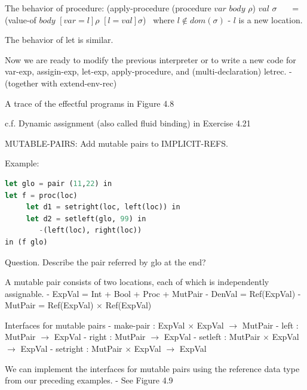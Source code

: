 \documentclass{article}
\begin{document}
\begin{huge}
The behavior of procedure: \al
(apply-procedure (procedure $var$ $body$ $\rho$) $val$ $\sigma$ \al
\ \ \ = (value-of $body$ $[var=l]\rho$ $[l=val]\sigma$) \ where $l\not\in dom(\sigma)$ \al
- $l$ is a new location.

The behavior of let is similar. \al


Now we are ready to modify the previous interpreter or to write a new code for var-exp, assigin-exp, let-exp, apply-procedure, and (multi-declaration) letrec. \al
- (together with extend-env-rec)

A trace of the effectful programs in Figure 4.8

c.f. Dynamic assignment (also called fluid binding) in Exercise 4.21


MUTABLE-PAIRS: Add mutable pairs to IMPLICIT-REFS.

Example: 
\begin{lstlisting}[language=Lisp]
let glo = pair (11,22) in
let f = proc(loc)
     let d1 = setright(loc, left(loc)) in
     let d2 = setleft(glo, 99) in
        -(left(loc), right(loc))
in (f glo)
\end{lstlisting}

Question. Describe the pair referred by glo at the end?


A mutable pair consists of two locations, each of which is independently assignable. \al
- ExpVal = Int + Bool + Proc + MutPair \al
- DenVal = Ref(ExpVal) \al
- MutPair = Ref(ExpVal) $\times$ Ref(ExpVal)

Interfaces for mutable pairs \al
- make-pair : ExpVal $\times$ ExpVal $\rightarrow$ MutPair \al
- left : MutPair $\rightarrow$ ExpVal \al
- right : MutPair $\rightarrow$ ExpVal \al
- setleft : MutPair $\times$ ExpVal $\rightarrow$ ExpVal \al
- setright : MutPair $\times$ ExpVal $\rightarrow$ ExpVal \al


We can implement the interfaces for mutable pairs using the reference data type from our preceding examples. \al
- See Figure 4.9


\end{huge}
\end{document}
